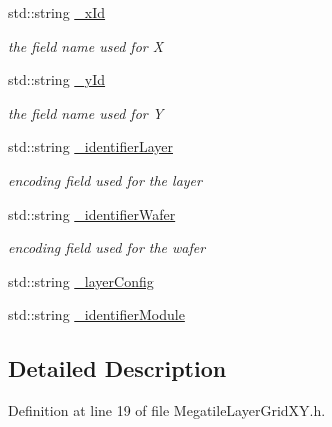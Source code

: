 \begin{DoxyCompactItemize}
\item 
std::string \hyperlink{class_d_d4hep_1_1_d_d_segmentation_1_1_megatile_layer_grid_x_y_a84cfbe6eadc2e1dfd01b276ec5a06cb3}{\_\-xId}
\begin{DoxyCompactList}\small\item\em the field name used for X \item\end{DoxyCompactList}\item 
std::string \hyperlink{class_d_d4hep_1_1_d_d_segmentation_1_1_megatile_layer_grid_x_y_af0dce96a744ec959a58a8d34e3e35469}{\_\-yId}
\begin{DoxyCompactList}\small\item\em the field name used for Y \item\end{DoxyCompactList}\item 
std::string \hyperlink{class_d_d4hep_1_1_d_d_segmentation_1_1_megatile_layer_grid_x_y_a9bd28cb051873b31327867a7636774e4}{\_\-identifierLayer}
\begin{DoxyCompactList}\small\item\em encoding field used for the layer \item\end{DoxyCompactList}\item 
std::string \hyperlink{class_d_d4hep_1_1_d_d_segmentation_1_1_megatile_layer_grid_x_y_a97bf5f24b4c9a44f74ae5c245c13c824}{\_\-identifierWafer}
\begin{DoxyCompactList}\small\item\em encoding field used for the wafer \item\end{DoxyCompactList}\item 
std::string \hyperlink{class_d_d4hep_1_1_d_d_segmentation_1_1_megatile_layer_grid_x_y_a71605d3d5b86f140cfb6c2d7458e3cd8}{\_\-layerConfig}
\item 
std::string \hyperlink{class_d_d4hep_1_1_d_d_segmentation_1_1_megatile_layer_grid_x_y_ac694e7f1d8e601f1893f84fb8bb6286f}{\_\-identifierModule}
\end{DoxyCompactItemize}


\subsection{Detailed Description}


Definition at line 19 of file MegatileLayerGridXY.h.

